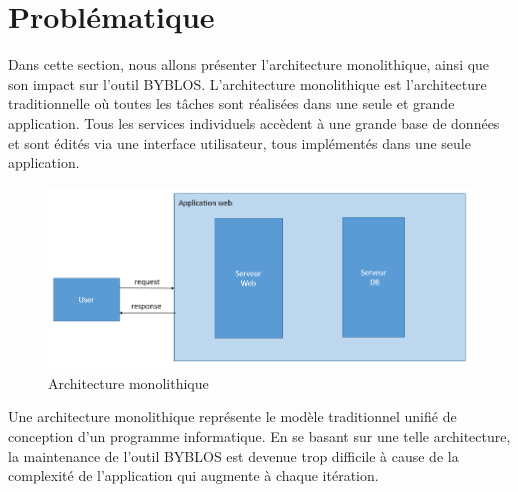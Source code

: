 \section{Problématique}
\color{black}Dans cette section, nous allons présenter l'architecture monolithique, ainsi que son impact sur l'outil BYBLOS. 
\color{black}
L'architecture monolithique est l'architecture traditionnelle où  toutes les tâches sont réalisées dans une seule et grande application. Tous les services individuels accèdent à une grande base de données et sont édités via une interface utilisateur, tous implémentés dans une seule application. 
\begin{figure}[H]
    \centering
    \includegraphics[scale=0.5]{img/archi mono.PNG}
    \caption{Architecture monolithique}
    \label{fig:Architecture monolitique}
\end{figure}

\color{black}
Une architecture monolithique représente le modèle traditionnel unifié de conception d'un programme informatique. En se basant sur une telle architecture, la maintenance de l'outil BYBLOS est devenue trop difficile à cause de la complexité de l'application qui augmente à chaque itération.


